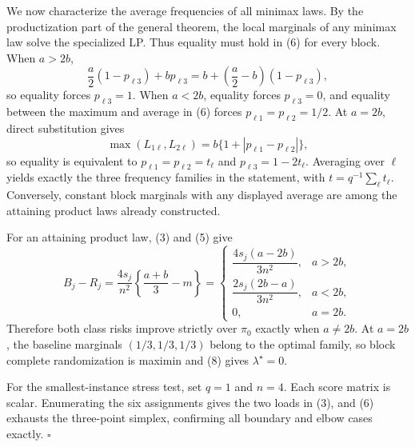 We now characterize the average frequencies of all minimax laws. By the productization part of the general theorem, the local marginals of any minimax law solve the specialized LP. Thus equality must hold in (6) for every block. When \(a>2b\),
\[
\frac a2(1-p_{\ell3})+bp_{\ell3}
=b+\left(\frac a2-b\right)(1-p_{\ell3}),
\]
so equality forces \(p_{\ell3}=1\). When \(a<2b\), equality forces \(p_{\ell3}=0\), and equality between the maximum and average in (6) forces \(p_{\ell1}=p_{\ell2}=1/2\). At \(a=2b\), direct substitution gives
\[
\max(L_{1\ell},L_{2\ell})
=b\{1+|p_{\ell1}-p_{\ell2}|\},
\]
so equality is equivalent to \(p_{\ell1}=p_{\ell2}=t_\ell\) and \(p_{\ell3}=1-2t_\ell\). Averaging over \(\ell\) yields exactly the three frequency families in the statement, with \(t=q^{-1}\sum_\ell t_\ell\). Conversely, constant block marginals with any displayed average are among the attaining product laws already constructed.

For an attaining product law, (3) and (5) give
\[
B_j-R_j
=\frac{4s_j}{n^2}\left\{\frac{a+b}{3}-m\right\}
=
\begin{cases}
\dfrac{4s_j(a-2b)}{3n^2},&a>2b,\\[6pt]
\dfrac{2s_j(2b-a)}{3n^2},&a<2b,\\[6pt]
0,&a=2b.
\end{cases}
\tag{9}
\]
Therefore both class risks improve strictly over \(\pi_0\) exactly when \(a\ne2b\). At \(a=2b\), the baseline marginals \((1/3,1/3,1/3)\) belong to the optimal family, so block complete randomization is maximin and (8) gives \(\lambda^\star=0\).

For the smallest-instance stress test, set \(q=1\) and \(n=4\). Each score matrix is scalar. Enumerating the six assignments gives the two loads in (3), and (6) exhausts the three-point simplex, confirming all boundary and elbow cases exactly. \(\square\)